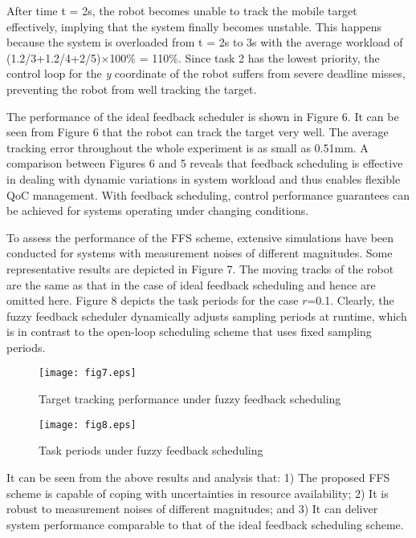 \documentclass[12pt,a4paper]{ijicic}
\begin{document}
After time t = 2s, the robot becomes unable to track the mobile
target effectively, implying that the system finally becomes
unstable. This happens because the system is overloaded from t = 2s
to 3s with the average workload of (1.2/3+1.2/4+2/5)$\times$100\% =
110\%. Since task 2 has the lowest priority, the control loop for
the \emph{y} coordinate of the robot suffers from severe deadline
misses, preventing the robot from well tracking the target.

The performance of the ideal feedback scheduler is shown in Figure
6. It can be seen from Figure 6 that the robot can track the target
very well. The average tracking error throughout the whole
experiment is as small as 0.51mm. A comparison between Figures 6 and
5 reveals that feedback scheduling is effective in dealing with
dynamic variations in system workload and thus enables flexible QoC
management. With feedback scheduling, control performance guarantees
can be achieved for systems operating under changing conditions.

To assess the performance of the FFS scheme, extensive simulations
have been conducted for systems with measurement noises of different
magnitudes. Some representative results are depicted in Figure 7.
The moving tracks of the robot are the same as that in the case of
ideal feedback scheduling and hence are omitted here. Figure 8
depicts the task periods for the case $r$=0.1. Clearly, the fuzzy
feedback scheduler dynamically adjusts sampling periods at runtime,
which is in contrast to the open-loop scheduling scheme that uses
fixed sampling periods.

\begin{figure}[htbp!]
\begin{minipage}[t]{0.47\textwidth} \centering
\texttt{[image: fig7.eps]}
\caption{Target tracking performance under fuzzy feedback
scheduling} \label{fig:7}
\end{minipage}\begin{minipage}[t]{0.47\textwidth}
\texttt{[image: fig8.eps]}
\caption{Task periods under fuzzy feedback scheduling}
\label{fig:8}
\end{minipage}
\end{figure}

It can be seen from the above results and analysis that: 1) The
proposed FFS scheme is capable of coping with uncertainties in
resource availability; 2) It is robust to measurement noises of
different magnitudes; and 3) It can deliver system performance
comparable to that of the ideal feedback scheduling scheme.
\end{document}
